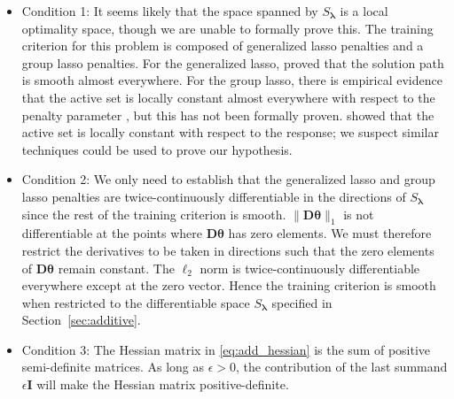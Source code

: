 \documentclass[12pt,letterpaper]{article}
\begin{document}
\begin{itemize}
	\item[] Condition 1: It seems likely that the space spanned by $S_{\boldsymbol{\lambda}}$ is a local optimality space, though we are unable to formally prove this. The training criterion for this problem is composed of generalized lasso penalties and a group lasso penalties. For the generalized lasso, \citet{tibshirani2011solution} proved that the solution path is smooth almost everywhere. For the group lasso, there is empirical evidence that the active set is locally constant almost everywhere with respect to the penalty parameter \citep{yuan2006model}, but this has not been formally proven. \citet{vaiter2012degrees} showed that the active set is locally constant with respect to the response; we suspect similar techniques could be used to prove our hypothesis.
	\item[] Condition 2:  We only need to establish that the generalized lasso and group lasso penalties are twice-continuously differentiable in the directions of $S_{\boldsymbol{\lambda}}$ since the rest of the training criterion is smooth. 
	$\| \boldsymbol{D} \boldsymbol{\theta} \|_1$ is not differentiable at the points where $\boldsymbol{D} \boldsymbol{\theta}$ has zero elements. We must therefore restrict the derivatives to be taken in directions such that the zero elements of $\boldsymbol{D} \boldsymbol{\theta}$ remain constant. The $\ell_2$ norm is twice-continuously differentiable everywhere except at the zero vector. Hence the training criterion is smooth when restricted to the differentiable space $S_{\boldsymbol{\lambda}}$ specified in Section~\ref{sec:additive}.
	\hfill {}
	\item[] Condition 3: The Hessian matrix in \eqref{eq:add_hessian} is the sum of positive semi-definite matrices. As long as $\epsilon > 0$, the contribution of the last summand $\epsilon \boldsymbol{I}$ will make the Hessian matrix positive-definite. \hfill {}
\end{itemize}
\end{document}
